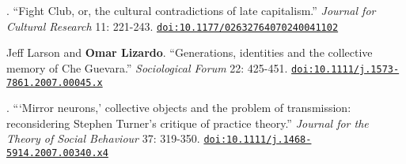 
. ``Fight Club, or, the cultural contradictions of late capitalism.''  {\em Journal for Cultural Research} 11:  221-243. \href{https://doi.org/10.1177/02632764070240041102}{\nolinkurl{doi:10.1177/02632764070240041102}}

\ind Jeff Larson and {\bf Omar Lizardo}. ``Generations, identities and the collective memory of Che Guevara.'' \emph{Sociological Forum} 22: 425-451. \href{https://doi.org/10.1111/j.1573-7861.2007.00045.x}{\nolinkurl{doi:10.1111/j.1573-7861.2007.00045.x}} 

. ```Mirror neurons,' collective objects and the problem of transmission:  reconsidering Stephen Turner's critique of practice theory.''  {\em Journal for the Theory of Social Behaviour} 37:  319-350. \href{https://doi.org/10.1111/j.1468-5914.2007.00340.x4}{\nolinkurl{doi:10.1111/j.1468-5914.2007.00340.x4}}

